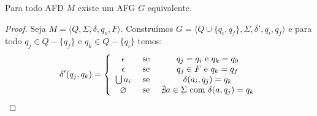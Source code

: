 \begin{lemma}
\label{lemma:afg1}
Para todo AFD $M$ existe um AFG $G$ equivalente.
\end{lemma}
\begin{proof}
  Seja  $M = \langle Q, \Sigma, \delta, q_o, F \rangle$.
  Construímos $G = \langle Q \cup \{q_i, q_f\}, \Sigma, \delta', q_i, q_f \rangle$ e para todo $q_j \in Q - \{q_f\}$ e $q_k \in Q - \{q_i\}$ temos:
\begin{displaymath}
 \delta'(q_j, q_k) = \left\{
    \begin{array}{ccc}
      \epsilon & \textrm{ se } & q_j = q_i \textrm{ e } q_k = q_0\\
      \epsilon & \textrm{ se } & q_j \in F \textrm{ e } q_k = q_f\\
      \bigcup a_i & \textrm{ se } & \delta(a_i, q_j) = q_k \\
      \o   & \textrm{ se } & \nexists a \in \Sigma \textrm{ com } \delta(a, q_j) = q_k \\
    \end{array}\right.
\end{displaymath}
\end{proof}



